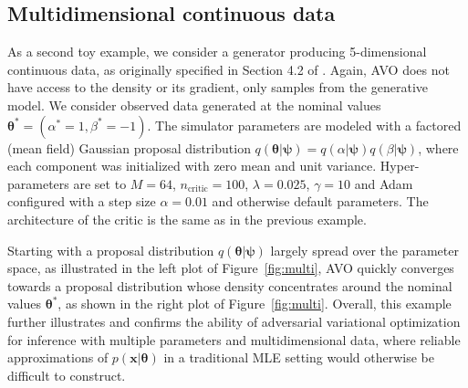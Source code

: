 \documentclass{article}
\newcommand{\bftheta}{{\bm \theta}}
\newcommand{\bfpsi}{{\bm \psi}}
\newcommand{\bfz}{\mathbf{z}}
\theoremstyle{plain}
\begin{document}
\subsection{Multidimensional continuous data}

As a second toy example, we consider a generator producing
5-dimensional continuous data, as originally specified in Section 4.2 of
\cite{cranmer2015approximating}.
Again, AVO does not have access to the density or its gradient, only samples from the generative model.
We consider observed data generated at the nominal values $\bftheta^* = (\alpha^*=1,\beta^*=-1)$.
The simulator parameters are modeled with a factored  (mean field) Gaussian
proposal distribution $q(\bftheta|\bfpsi) = q(\alpha|\bfpsi) q(\beta|\bfpsi)$, where each component was
initialized with zero mean and unit variance.
Hyper-parameters are set to $M=64$, $n_\text{critic}=100$, $\lambda=0.025$, $\gamma=10$ and
Adam configured with a step size $\alpha=0.01$ and otherwise default parameters.
The architecture of the critic is the same as in the previous example.


Starting with a proposal distribution $q(\bftheta|\bfpsi)$ largely spread over
the parameter space, as illustrated in the left plot of Figure~\ref{fig:multi},
AVO quickly converges towards a proposal distribution whose density
concentrates around the nominal values $\bftheta^*$, as shown in the right plot of Figure~\ref{fig:multi}.
Overall, this example further illustrates and confirms the ability of adversarial
variational optimization for inference with multiple parameters and multidimensional
data, where reliable approximations of $p(\mathbf{x}|\bftheta)$ in a traditional
MLE setting would otherwise be difficult to construct.
\end{document}

